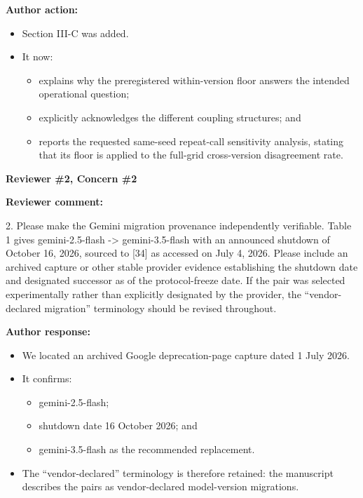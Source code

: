 \documentclass[11pt]{article}
\newcommand{\rvcomment}[1]{{\color{ReviewerGreen}#1}}
\newcommand{\concern}[1]{\textbf{\color{ReviewerGreen}#1}}
\begin{document}
\textbf{Author action:}

\begin{itemize}

\item Section III-C was added.

\item It now:

\begin{itemize}

\item explains why the preregistered within-version floor answers the intended operational question;

\item explicitly acknowledges the different coupling structures; and

\item reports the requested same-seed repeat-call sensitivity analysis, stating that its floor is applied to the full-grid cross-version disagreement rate.

\end{itemize}

\end{itemize}

\vspace{12pt}
\concern{Reviewer \#2, Concern \#2}

\concern{Reviewer comment:}

\rvcomment{2. Please make the Gemini migration provenance independently verifiable. Table 1 gives gemini-2.5-flash -> gemini-3.5-flash with an announced shutdown of October 16, 2026, sourced to [34] as accessed on July 4, 2026. Please include an archived capture or other stable provider evidence establishing the shutdown date and designated successor as of the protocol-freeze date. If the pair was selected experimentally rather than explicitly designated by the provider, the ``vendor-declared migration'' terminology should be revised throughout.}

\textbf{Author response:}

\begin{itemize}

\item We located an archived Google deprecation-page capture dated 1 July 2026.

\item It confirms:

\begin{itemize}

\item gemini-2.5-flash;

\item shutdown date 16 October 2026; and

\item gemini-3.5-flash as the recommended replacement.

\end{itemize}

\item The ``vendor-declared'' terminology is therefore retained: the manuscript describes the pairs as vendor-declared model-version migrations.

\end{itemize}
\end{document}
